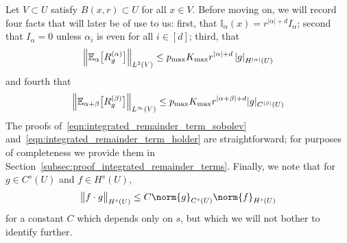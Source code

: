 \documentclass{article}
\newcommand{\abs}[1]{\left \lvert #1 \right \rvert}
\newcommand{\1}{\mathbf{1}}
\newcommand{\Leb}{L}
\newcommand{\Ebb}{\mathbb{E}}
\newcommand{\Ibb}{\mathbb{I}}
\theoremstyle{alden}
\theoremstyle{aldenthm}
\theoremstyle{definition}
\theoremstyle{remark}
\begin{document}
Let $V \subset U$ satisfy $B(x,r) \subset U$ for all $x \in V$. Before moving on, we will record four facts that will later be of use to us:  first, that $\Ibb_{\alpha}(x) = r^{\abs{\alpha} + d} I_{\alpha}$; second that $I_{\alpha} = 0$ unless $\alpha_i$ is even for all $i \in [d]$; third, that
\begin{equation}
\label{eqn:integrated_remainder_term_sobolev}
\Bigl\|\Ebb_{\alpha}\bigl[R_g^{(\alpha)}\bigr]\Bigr\|_{\Leb^2(V)} \leq p_{\max} K_{\max} r^{\abs{\alpha} + d} \abs{g}_{H^{\abs{\alpha}}(U)}
\end{equation}
and fourth that
\begin{equation}
\label{eqn:integrated_remainder_term_holder}
\Bigl\|\Ebb_{\alpha + \beta}\bigl[R_g^{(\beta)}\bigr]\Bigr\|_{\Leb^{\infty}(V)} \leq p_{\max} K_{\max} r^{\abs{\alpha + \beta} + d} |g|_{C^{\abs{\beta}}(U)}
\end{equation}
The proofs of~\eqref{eqn:integrated_remainder_term_sobolev} and~\eqref{eqn:integrated_remainder_term_holder} are straightforward; for purposes of completeness we provide them in Section~\ref{subsec:proof_integrated_remainder_terms}.
Finally, we note that for $g \in C^{s}(U)$ and $f \in H^s(U)$, 
\begin{equation}
\label{eqn:product_rule_sobolev}
\bigl\|f \cdot g\bigr\|_{H^s(U)} \leq C \norm{g}_{C^s(U)} \norm{f}_{H^s(U)}
\end{equation}
for a constant $C$ which depends only on $s$, but which we will not bother to identify further.
\end{document}
